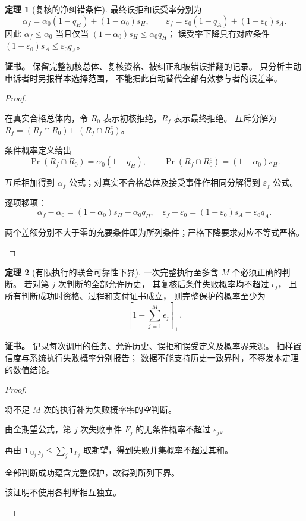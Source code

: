 \documentclass[UTF8,12pt,a4paper,openany,fontset=none,zihao=false]{ctexrep}
\theoremstyle{definition}
\newtheorem{theorem}{定理}[chapter]
\newenvironment{certificate}{\par\noindent\textbf{证书。}\ignorespaces}{\par}
\newcommand{\1}{\mathbf 1}
\begin{document}
\begin{theorem}[复核的净纠错条件]
\label{inc:thm-review}
最终误拒和误受率分别为
\[
 \alpha_f=\alpha_0(1-q_H)+(1-\alpha_0)s_H,\qquad
 \varepsilon_f=\varepsilon_0(1-q_A)+(1-\varepsilon_0)s_A.
\]
因此 \(\alpha_f\le\alpha_0\) 当且仅当
\((1-\alpha_0)s_H\le\alpha_0q_H\)；
误受率下降具有对应条件
\((1-\varepsilon_0)s_A\le\varepsilon_0q_A\)。
\end{theorem}
\begin{certificate}
保留完整初核总体、复核资格、被纠正和被错误推翻的记录。
只分析主动申诉者时另报样本选择范围，
不能据此自动替代全部有效参与者的误差率。
\end{certificate}
\begin{proof}
\begin{semanticsteps}
\item 在真实合格总体内，令 \(R_0\) 表示初核拒绝，\(R_f\) 表示最终拒绝。
互斥分解为 \(R_f=(R_f\cap R_0)\sqcup(R_f\cap R_0^c)\)。
\item 条件概率定义给出
\[
\Pr(R_f\cap R_0)=\alpha_0(1-q_H),\qquad
\Pr(R_f\cap R_0^c)=(1-\alpha_0)s_H.
\]
\item 互斥相加得到 \(\alpha_f\) 公式；对真实不合格总体及接受事件作相同分解得到 \(\varepsilon_f\) 公式。
\item 逐项移项：
\[
\alpha_f-\alpha_0=(1-\alpha_0)s_H-\alpha_0q_H,
\quad
\varepsilon_f-\varepsilon_0=(1-\varepsilon_0)s_A-\varepsilon_0q_A.
\]
\item 两个差额分别不大于零的充要条件即为所列条件；严格下降要求对应不等式严格。
\end{semanticsteps}
\end{proof}

\begin{theorem}[有限执行的联合可靠性下界]
\label{inc:thm-union-bound}
一次完整执行至多含 \(M\) 个必须正确的判断。
若对第 \(j\) 次判断的全部允许历史，
其复核后条件失败概率均不超过 \(\epsilon_j\)，
且所有判断成功时资格、过程和支付证书成立，
则完整保护的概率至少为
\[
 \left[1-\sum_{j=1}^{M}\epsilon_j\right]_+.
\]
\end{theorem}
\begin{certificate}
记录每次调用的任务、允许历史、误拒和误受定义及概率界来源。
抽样置信度与系统执行失败概率分别报告；
数据不能支持历史一致界时，不签发本定理的数值结论。
\end{certificate}
\begin{proof}
\begin{semanticsteps}
\item 将不足 \(M\) 次的执行补为失败概率零的空判断。
\item 由全期望公式，第 \(j\) 次失败事件 \(F_j\) 的无条件概率不超过 \(\epsilon_j\)。
\item 再由
\(\mathbf 1_{\cup_jF_j}\le\sum_j\mathbf 1_{F_j}\)
取期望，得到失败并集概率不超过其和。
\item 全部判断成功蕴含完整保护，故得到所列下界。
\item 该证明不使用各判断相互独立。
\end{semanticsteps}
\end{proof}
\end{document}
